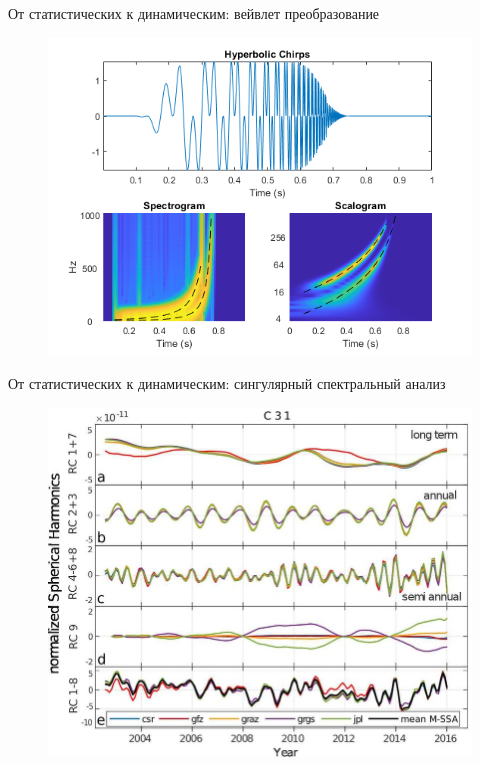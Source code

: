 \begin{frame}{От статистических к динамическим: вейвлет преобразование}
	\begin{figure}
		\centering
		\includegraphics[width=0.8\linewidth]{lecture_1/figs/wavelet.png}
	\end{figure}
\end{frame}
\begin{frame}{От статистических к динамическим: сингулярный спектральный анализ}
	\begin{figure}
		\centering
		\includegraphics[width=0.8\linewidth]{./figs/ssa.jpg}
	\end{figure}
\end{frame}

